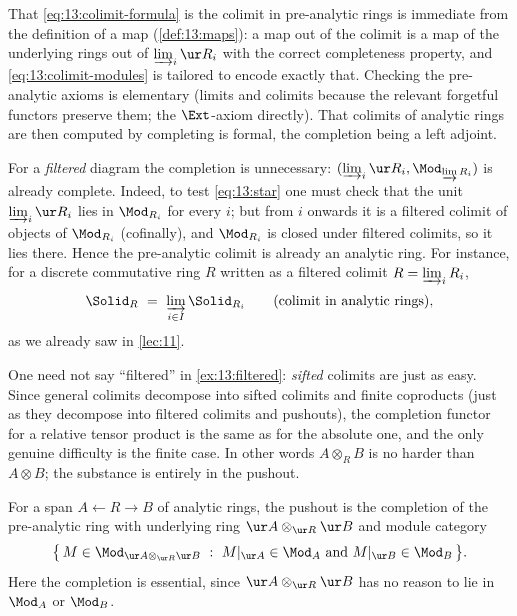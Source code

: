 That \eqref{eq:13:colimit-formula} is the colimit in pre-analytic rings is
immediate from the definition of a map (\cref{def:13:maps}): a map out of the
colimit is a map of the underlying rings out of $\varinjlim_i\ur R_i$ with the
correct completeness property, and \eqref{eq:13:colimit-modules} is tailored to
encode exactly that. Checking the pre-analytic axioms is elementary (limits and
colimits because the relevant forgetful functors preserve them; the $\Ext$-axiom
directly). That colimits of analytic rings are then computed by completing is
formal, the completion being a left adjoint.

\begin{example}
\label{ex:13:filtered}
For a \emph{filtered} diagram the completion is unnecessary:
$(\varinjlim_i\ur R_i,\Mod_{\varinjlim R_i})$ is already complete. Indeed, to
test \eqref{eq:13:star} one must check that the unit $\varinjlim_i\ur R_i$ lies in
$\Mod_{R_i}$ for every $i$; but from $i$ onwards it is a filtered colimit of
objects of $\Mod_{R_i}$ (cofinally), and $\Mod_{R_i}$ is closed under filtered
colimits, so it lies there. Hence the pre-analytic colimit is already an analytic
ring. For instance, for a discrete commutative ring $R$ written as a filtered
colimit $R=\varinjlim_i R_i$,
\begin{equation*}
\Solid_R\ =\ \varinjlim_{i\in I}\Solid_{R_i}\qquad(\text{colimit in analytic rings}),
\end{equation*}
as we already saw in \cref{lec:11}.
\end{example}

\begin{remark}
\label{rmk:13:sifted}
One need not say ``filtered'' in \cref{ex:13:filtered}: \emph{sifted} colimits are
just as easy. Since general colimits decompose into sifted colimits and finite
coproducts (just as they decompose into filtered colimits and pushouts), the
completion functor for a relative tensor product is the same as for the absolute
one, and the only genuine difficulty is the finite case. In other words
$A\otimes_R B$ is no harder than $A\otimes B$; the substance is entirely in the
pushout.
\end{remark}

\begin{example}
\label{ex:13:pushouts}
For a span $A\leftarrow R\rightarrow B$ of analytic rings, the pushout is the
completion of the pre-analytic ring with underlying ring $\ur A\otimes_{\ur R}\ur B$
and module category
\begin{equation}
\label{eq:13:pushout-modules}
\big\{\,M\in\Mod_{\ur A\otimes_{\ur R}\ur B}\ :\ M|_{\ur A}\in\Mod_A\ \text{and}\ M|_{\ur B}\in\Mod_B\,\big\}.
\end{equation}
Here the completion is essential, since $\ur A\otimes_{\ur R}\ur B$ has no reason
to lie in $\Mod_A$ or $\Mod_B$.
\end{example}

